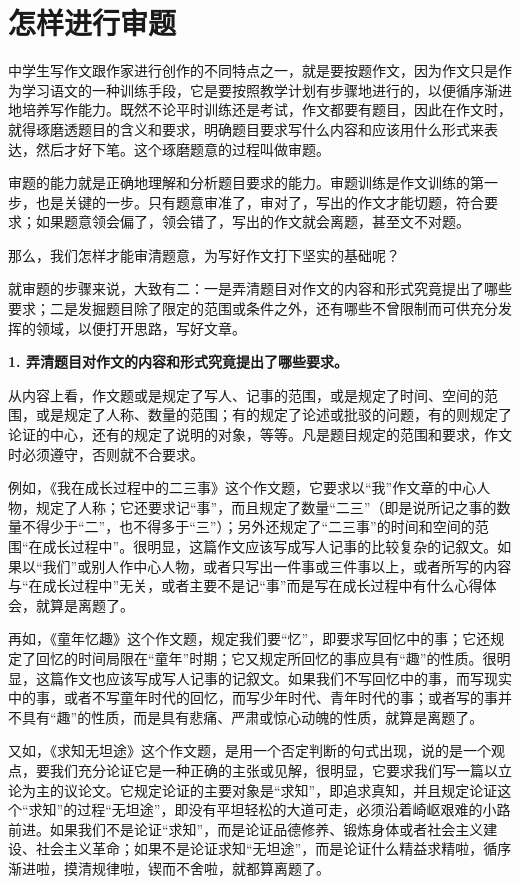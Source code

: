 \section{怎样进行审题}


中学生写作文跟作家进行创作的不同特点之一，就是要按题作文，因为作文只是作为学习语文的一种训练手段，它是要按照教学计划有步骤地进行的，以便循序渐进地培养写作能力。既然不论平时训练还是考试，作文都要有题目，因此在作文时，就得琢磨透题目的含义和要求，明确题目要求写什么内容和应该用什么形式来表达，然后才好下笔。这个琢磨题意的过程叫做审题。

审题的能力就是正确地理解和分析题目要求的能力。审题训练是作文训练的第一步，也是关键的一步。只有题意审准了，审对了，写出的作文才能切题，符合要求；如果题意领会偏了，领会错了，写出的作文就会离题，甚至文不对题。

那么，我们怎样才能审清题意，为写好作文打下坚实的基础呢？

就审题的步骤来说，大致有二：一是弄清题目对作文的内容和形式究竟提出了哪些要求；二是发掘题目除了限定的范围或条件之外，还有哪些不曾限制而可供充分发挥的领域，以便打开思路，写好文章。

\textbf{1. 弄清题目对作文的内容和形式究竟提出了哪些要求。}

从内容上看，作文题或是规定了写人、记事的范围，或是规定了时间、空间的范围，或是规定了人称、数量的范围；有的规定了论述或批驳的问题，有的则规定了论证的中心，还有的规定了说明的对象，等等。凡是题目规定的范围和要求，作文时必须遵守，否则就不合要求。

例如，《我在成长过程中的二三事》这个作文题，它要求以“我”作文章的中心人物，规定了人称；它还要求记“事”，而且规定了数量“二三”（即是说所记之事的数量不得少于“二”，也不得多于“三”）；另外还规定了“二三事”的时间和空间的范围“在成长过程中”。很明显，这篇作文应该写成写人记事的比较复杂的记叙文。如果以“我们”或别人作中心人物，或者只写出一件事或三件事以上，或者所写的内容与“在成长过程中”无关，或者主要不是记“事”而是写在成长过程中有什么心得体会，就算是离题了。

再如，《童年忆趣》这个作文题，规定我们要“忆”，即要求写回忆中的事；它还规定了回忆的时间局限在“童年”时期；它又规定所回忆的事应具有“趣”的性质。很明显，这篇作文也应该写成写人记事的记叙文。如果我们不写回忆中的事，而写现实中的事，或者不写童年时代的回忆，而写少年时代、青年时代的事；或者写的事并不具有“趣”的性质，而是具有悲痛、严肃或惊心动魄的性质，就算是离题了。

又如，《求知无坦途》这个作文题，是用一个否定判断的句式出现，说的是一个观点，要我们充分论证它是一种正确的主张或见解，很明显，它要求我们写一篇以立论为主的议论文。它规定论证的主要对象是“求知”，即追求真知，并且规定论证这个“求知”的过程“无坦途”，即没有平坦轻松的大道可走，必须沿着崎岖艰难的小路前进。如果我们不是论证“求知”，而是论证品德修养、锻炼身体或者社会主义建设、社会主义革命；如果不是论证求知“无坦途”，而是论证什么精益求精啦，循序渐进啦，摸清规律啦，锲而不舍啦，就都算离题了。

